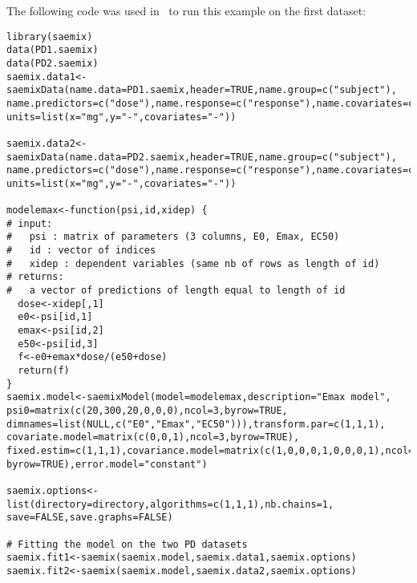{The following code was used in \R~to run this example on the first dataset:
\begin{verbatim}
library(saemix)
data(PD1.saemix)
data(PD2.saemix)
saemix.data1<-saemixData(name.data=PD1.saemix,header=TRUE,name.group=c("subject"), 
name.predictors=c("dose"),name.response=c("response"),name.covariates=c("gender"), 
units=list(x="mg",y="-",covariates="-"))

saemix.data2<-saemixData(name.data=PD2.saemix,header=TRUE,name.group=c("subject"), 
name.predictors=c("dose"),name.response=c("response"),name.covariates=c("gender"), 
units=list(x="mg",y="-",covariates="-"))

modelemax<-function(psi,id,xidep) {
# input:
#   psi : matrix of parameters (3 columns, E0, Emax, EC50)
#   id : vector of indices 
#   xidep : dependent variables (same nb of rows as length of id)
# returns:
#   a vector of predictions of length equal to length of id
  dose<-xidep[,1]
  e0<-psi[id,1]
  emax<-psi[id,2]
  e50<-psi[id,3]
  f<-e0+emax*dose/(e50+dose)
  return(f)
}
saemix.model<-saemixModel(model=modelemax,description="Emax model", 
psi0=matrix(c(20,300,20,0,0,0),ncol=3,byrow=TRUE,
dimnames=list(NULL,c("E0","Emax","EC50"))),transform.par=c(1,1,1), 
covariate.model=matrix(c(0,0,1),ncol=3,byrow=TRUE), 
fixed.estim=c(1,1,1),covariance.model=matrix(c(1,0,0,0,1,0,0,0,1),ncol=3,
byrow=TRUE),error.model="constant")

saemix.options<-list(directory=directory,algorithms=c(1,1,1),nb.chains=1, 
save=FALSE,save.graphs=FALSE)

# Fitting the model on the two PD datasets
saemix.fit1<-saemix(saemix.model,saemix.data1,saemix.options)
saemix.fit2<-saemix(saemix.model,saemix.data2,saemix.options)
\end{verbatim}

}
